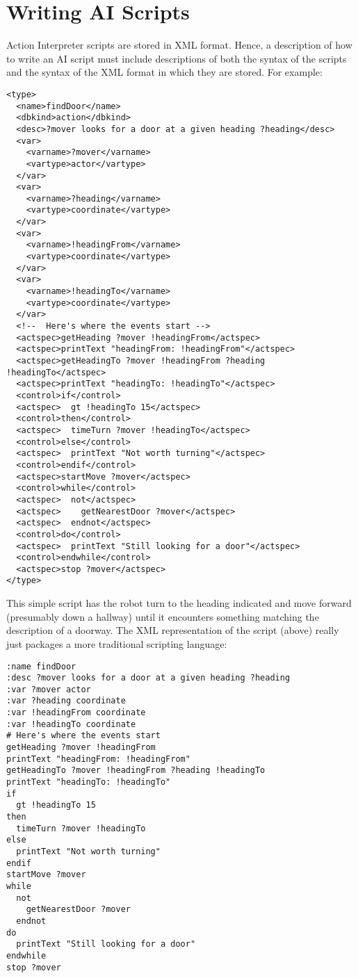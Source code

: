\documentclass[11pt,letterpaper]{article}
\begin{document}
\section{Writing AI Scripts}

Action Interpreter scripts are stored in XML format.  Hence, a
description of how to write an AI script must include descriptions of
both the syntax of the scripts and the syntax of the XML format in
which they are stored.  For example:

\begin{Verbatim}
<type>
  <name>findDoor</name>
  <dbkind>action</dbkind>
  <desc>?mover looks for a door at a given heading ?heading</desc>
  <var>
    <varname>?mover</varname>
    <vartype>actor</vartype>
  </var>
  <var>
    <varname>?heading</varname>
    <vartype>coordinate</vartype>
  </var>
  <var>
    <varname>!headingFrom</varname>
    <vartype>coordinate</vartype>
  </var>
  <var>
    <varname>!headingTo</varname>
    <vartype>coordinate</vartype>
  </var>
  <!--  Here's where the events start -->
  <actspec>getHeading ?mover !headingFrom</actspec>
  <actspec>printText "headingFrom: !headingFrom"</actspec>
  <actspec>getHeadingTo ?mover !headingFrom ?heading !headingTo</actspec>
  <actspec>printText "headingTo: !headingTo"</actspec>
  <control>if</control>
  <actspec>  gt !headingTo 15</actspec>
  <control>then</control>
  <actspec>  timeTurn ?mover !headingTo</actspec>
  <control>else</control>
  <actspec>  printText "Not worth turning"</actspec>
  <control>endif</control>
  <actspec>startMove ?mover</actspec>
  <control>while</control>
  <actspec>  not</actspec>
  <actspec>    getNearestDoor ?mover</actspec>
  <actspec>  endnot</actspec>
  <control>do</control>
  <actspec>  printText "Still looking for a door"</actspec>
  <control>endwhile</control>
  <actspec>stop ?mover</actspec>
</type>
\end{Verbatim}

\noindent This simple script has the robot turn to the heading 
indicated and move forward (presumably down a hallway) until it 
encounters something matching the description of a doorway.  The XML 
representation of the script (above) really just packages a more
traditional scripting language:

\begin{Verbatim}
:name findDoor
:desc ?mover looks for a door at a given heading ?heading
:var ?mover actor 
:var ?heading coordinate 
:var !headingFrom coordinate 
:var !headingTo coordinate 
# Here's where the events start
getHeading ?mover !headingFrom
printText "headingFrom: !headingFrom"
getHeadingTo ?mover !headingFrom ?heading !headingTo
printText "headingTo: !headingTo"
if
  gt !headingTo 15
then
  timeTurn ?mover !headingTo
else
  printText "Not worth turning"
endif
startMove ?mover
while
  not
    getNearestDoor ?mover
  endnot
do
  printText "Still looking for a door"
endwhile
stop ?mover
\end{Verbatim}
\end{document}
